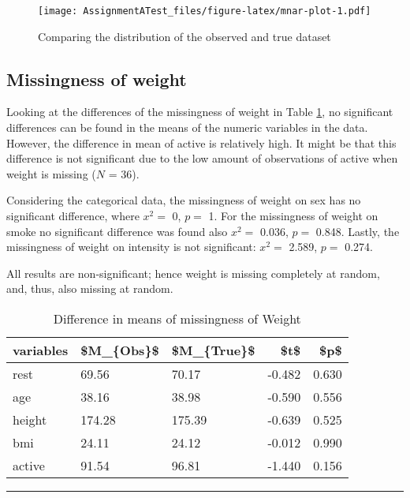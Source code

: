 \documentclass[
]{article}
\begin{document}
\begin{figure}
\centering
\texttt{[image: AssignmentATest\_files/figure-latex/mnar-plot-1.pdf]}
\caption{\label{fig:mnar-plot}Comparing the distribution of the observed and true dataset}
\end{figure}

\hypertarget{missW}{%
\subsection{Missingness of weight}\label{missW}}

Looking at the differences of the missingness of weight in Table \ref{tab:missW}, no significant differences can be found in the means of the numeric variables in the data. However, the difference in mean of active is relatively high. It might be that this difference is not significant due to the low amount of observations of active when weight is missing (\(N\) = 36).

Considering the categorical data, the missingness of weight on sex has no significant difference, where \(x^2 =\) 0, \(p =\) 1. For the missingness of weight on smoke no significant difference was found also \(x^2 =\) 0.036, \(p =\) 0.848. Lastly, the missingness of weight on intensity is not significant: \(x^2 =\) 2.589, \(p =\) 0.274.

All results are non-significant; hence weight is missing completely at random, and, thus, also missing at random.

\begin{table}

\caption{\label{tab:missW}Difference in means of missingness of Weight}
\centering
\begin{tabular}[t]{l|l|l|r|r}
\hline
variables & \$M\_\{Obs\}\$ & \$M\_\{True\}\$ & \$t\$ & \$p\$\\
\hline
rest & 69.56 & 70.17 & -0.482 & 0.630\\
\hline
age & 38.16 & 38.98 & -0.590 & 0.556\\
\hline
height & 174.28 & 175.39 & -0.639 & 0.525\\
\hline
bmi & 24.11 & 24.12 & -0.012 & 0.990\\
\hline
active & 91.54 & 96.81 & -1.440 & 0.156\\
\hline
\end{tabular}
\end{table}

\begin{center}\rule{0.5\linewidth}{0.5pt}\end{center}
\end{document}
